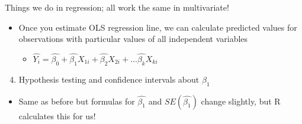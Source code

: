 \documentclass[
  8pt,
  ignorenonframetext,
  dvipsnames]{beamer}
\providecommand{\tightlist}{%
  \setlength{\itemsep}{0pt}\setlength{\parskip}{0pt}}
\let\olditem\item
\renewcommand{\item}{%
  \olditem\vspace{4pt}
}
\begin{document}
\begin{frame}{Things we do in regression; all work the same in
multivariate!}
\begin{itemize}
\tightlist
\item
  Once you estimate OLS regression line, we can calculate predicted
  values for observations with particular values of all independent
  variables

  \begin{itemize}
  \tightlist
  \item
    \(\hat{Y_i} = \hat{\beta_0} + \hat{\beta_1} X_{1i} + \hat{\beta_2} X_{2i} + ... \hat{\beta_k} X_{ki}\)
  \end{itemize}
\end{itemize}

\begin{enumerate}
\setcounter{enumi}{3}
\tightlist
\item
  Hypothesis testing and confidence intervals about \(\beta_1\)
\end{enumerate}

\begin{itemize}
\tightlist
\item
  Same as before but formulas for \(\hat{\beta_1}\) and
  \(SE(\hat{\beta_1})\) change slightly, but R calculates this for us!
\end{itemize}

\end{frame}
\end{document}
